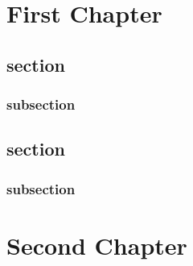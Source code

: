 \documentclass{book}
\begin{document}
  
  \setcounter{page}{0}
  \tableofcontents
  \newpage
  \chapter{First Chapter}
  \section{section}
  \subsection{subsection}
  \section{section}
  \subsection{subsection }
  \lipsum[1-10]
  \chapter{Second Chapter}
  \lipsum[1-15]
  
  
\end{document}
